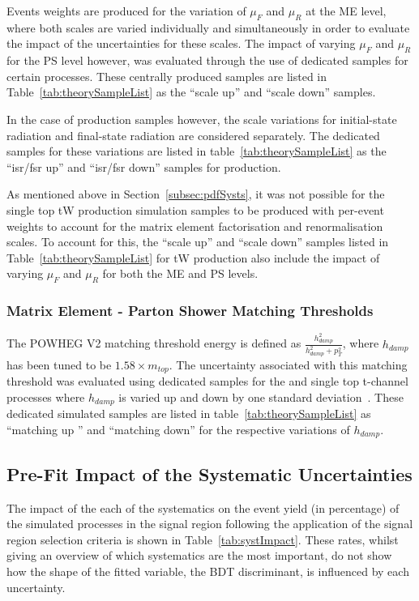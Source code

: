Events weights are produced for the variation of $\mu_{F}$ and $\mu_{R}$ at the ME level, where both scales are varied individually and simultaneously in order to evaluate the impact of the uncertainties for these scales.
The impact of varying $\mu_{F}$ and $\mu_{R}$ for the PS level however, was evaluated through the use of dedicated samples for certain processes.
These centrally produced samples are listed in Table~\ref{tab:theorySampleList} as the ``scale up'' and ``scale down'' samples. 

In the case of \ttbar production samples however, the scale variations for initial-state radiation and final-state radiation are considered separately.
The dedicated samples for these variations are listed in table~\ref{tab:theorySampleList} as the ``isr/fsr up'' and ``isr/fsr down'' samples for \ttbar production.

As mentioned above in Section~\ref{subsec:pdfSysts}, it was not possible for the single top tW production simulation samples to be produced with per-event weights to account for the matrix element factorisation and renormalisation scales.
To account for this, the ``scale up'' and ``scale down'' samples listed in Table~\ref{tab:theorySampleList} for tW production also include the impact of varying $\mu_{F}$ and $\mu_{R}$ for both the ME and PS levels.

\subsubsection{Matrix Element - Parton Shower Matching Thresholds}
The POWHEG V2 matching threshold energy is defined as $\frac{h_{damp}^{2}}{h_{damp}^{2}+p_{T}^{2}}$, where $h_{damp}$ has been tuned to be $1.58 \times m_{top}$.
The uncertainty associated with this matching threshold was evaluated using dedicated samples for the \ttbar and single top t-channel processes where $h_{damp}$ is varied up and down by one standard deviation~\cite{CMS:2016kle}.
These dedicated simulated samples are listed in table~\ref{tab:theorySampleList} as ``matching up '' and ``matching down'' for the respective variations of $h_{damp}$.

\subsection{Pre-Fit Impact of the Systematic Uncertainties}\label{sec:uncertainitiesPreFitImpact}
The impact of the each of the systematics on the event yield (in percentage) of the simulated processes in the signal region following the application of the signal region selection criteria is shown in Table~\ref{tab:systImpact}.
These rates, whilst giving an overview of which systematics are the most important, do not show how the shape of the fitted variable, the BDT discriminant, is influenced by each uncertainty.

